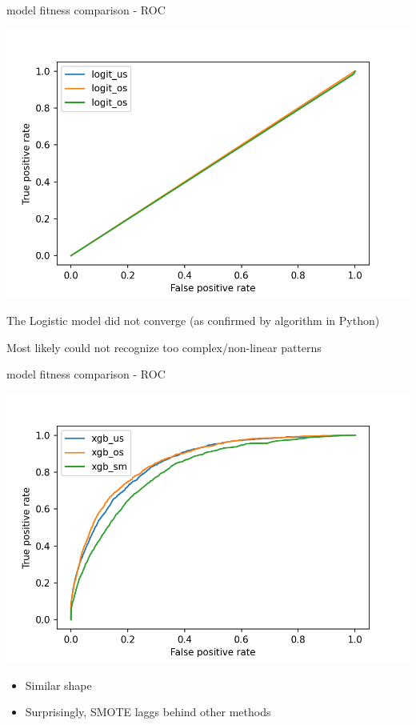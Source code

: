 \documentclass{beamer}
\begin{document}
\begin{frame}{model fitness comparison - ROC}

\begin{center}
\includegraphics[scale=0.5]{img/log_roc.png}
\end{center}

The Logistic model did not converge (as confirmed by algorithm in Python)

Most likely could not recognize too complex/non-linear patterns

\end{frame}

\begin{frame}{model fitness comparison - ROC}

\begin{center}
\includegraphics[scale=0.54]{img/xgb_roc.png}
\end{center}

\begin{itemize}
\item Similar shape
\item Surprisingly, SMOTE laggs behind other methods
\end{itemize}

\end{frame}
\end{document}
